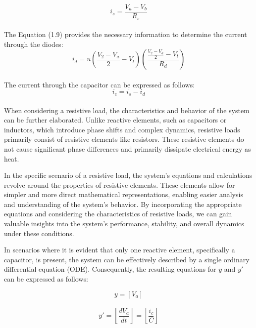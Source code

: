 \begin{equation}
    i_s=\frac{V_a-V_b}{R_s}
\end{equation}\\

The Equation (1.9) provides the necessary information to determine the current through the diodes:\\

\begin{equation}
    i_d=u(\frac{V_2-V_a}{2}-V_t)(\frac{\frac{V_2-V_a}{2}-V_t}{R_d})
\end{equation}\\

The current through the capacitor can be expressed as follows:\\

\begin{equation}
    i_c=i_s-i_d
\end{equation}\\

When considering a resistive load, the characteristics and behavior of the system can be further elaborated. Unlike reactive elements, such as capacitors or inductors, which introduce phase shifts and complex dynamics, resistive loads primarily consist of resistive elements like resistors. These resistive elements do not cause significant phase differences and primarily dissipate electrical energy as heat.

In the specific scenario of a resistive load, the system's equations and calculations revolve around the properties of resistive elements. These elements allow for simpler and more direct mathematical representations, enabling easier analysis and understanding of the system's behavior. By incorporating the appropriate equations and considering the characteristics of resistive loads, we can gain valuable insights into the system's performance, stability, and overall dynamics under these conditions.

In scenarios where it is evident that only one reactive element, specifically a capacitor, is present, the system can be effectively described by a single ordinary differential equation (ODE). Consequently, the resulting equations for $y$ and $y'$ can be expressed as follows:

\begin{equation}
    y=[V_a]
\end{equation}\\

\begin{equation}
    y'=[\frac{dV_a}{dt}]=[\frac{i_c}{C}]
\end{equation}\\

